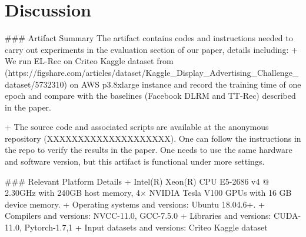 \section{Discussion}
### Artifact Summary
The artifact contains codes and instructions needed to carry out experiments in the evaluation section of our paper, details including:
+ We run EL-Rec on Criteo Kaggle dataset from (https://figshare.com/articles/dataset/Kaggle_Display_Advertising_Challenge_dataset/5732310) on AWS p3.8xlarge instance and record the training time of one epoch and compare with the baselines (Facebook DLRM and TT-Rec) described in the paper.

+ The source code and associated scripts are available at the anonymous repository (XXXXXXXXXXXXXXXXXXXX). One can follow the instructions in the repo to verify the results in the paper. One needs to use the same hardware and software version, but this artifact is functional under more settings.

### Relevant Platform Details
+ Intel(R) Xeon(R) CPU E5-2686 v4 @ 2.30GHz with 240GB host memory, 4$\times$ NVIDIA Tesla V100 GPUs with 16 GB device memory.
+ Operating systems and versions: Ubuntu 18.04.6+.
+ Compilers and versions: NVCC-11.0, GCC-7.5.0
+ Libraries and versions: CUDA-11.0, Pytorch-1.7,1
+ Input datasets and versions: Criteo Kaggle dataset